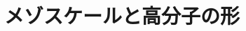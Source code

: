 \documentclass[a4paper,11pt]{ltjsarticle}
\begin{document}



\thispagestyle{empty}
\newpage

\setcounter{page}{1}
\section{メゾスケールと高分子の形}





\end{document}
